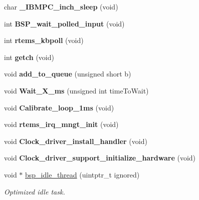 \begin{DoxyCompactItemize}
char {\bfseries \+\_\+\+I\+B\+M\+P\+C\+\_\+inch\+\_\+sleep} (void)
\item 
\mbox{\label{group__RTEMSBSPsI386_ga7a603adb911a24d3d1f83840460815a3}} 
int {\bfseries B\+S\+P\+\_\+wait\+\_\+polled\+\_\+input} (void)
\item 
\mbox{\label{group__RTEMSBSPsI386_ga06d1618e36290025c8a87c423f66f895}} 
int {\bfseries rtems\+\_\+kbpoll} (void)
\item 
\mbox{\label{group__RTEMSBSPsI386_gaf5978fab9fa6dd4ced1c3a8ab1251f7b}} 
int {\bfseries getch} (void)
\item 
\mbox{\label{group__RTEMSBSPsI386_ga1f6561356e0c50db503563bc00d2c3de}} 
void {\bfseries add\+\_\+to\+\_\+queue} (unsigned short b)
\item 
\mbox{\label{group__RTEMSBSPsI386_ga7279e1add0a06702c966055df34df803}} 
void {\bfseries Wait\+\_\+\+X\+\_\+ms} (unsigned int time\+To\+Wait)
\item 
\mbox{\label{group__RTEMSBSPsI386_ga7333093911cae08c22249ab462870ee2}} 
void {\bfseries Calibrate\+\_\+loop\+\_\+1ms} (void)
\item 
\mbox{\label{group__RTEMSBSPsI386_ga93c966a09459d552a4c5443b569e5bf3}} 
void {\bfseries rtems\+\_\+irq\+\_\+mngt\+\_\+init} (void)
\item 
\mbox{\label{group__RTEMSBSPsI386_ga1037814eae8e4f0d78249e0f87fed3cb}} 
void {\bfseries Clock\+\_\+driver\+\_\+install\+\_\+handler} (void)
\item 
\mbox{\label{group__RTEMSBSPsI386_gad90bc73e8844a9a72764b76a89681b3d}} 
void {\bfseries Clock\+\_\+driver\+\_\+support\+\_\+initialize\+\_\+hardware} (void)
\item 
void $\ast$ \mbox{\hyperlink{group__RTEMSBSPsI386_ga301be7085b80c41a9c5887247003c662}{bsp\+\_\+idle\+\_\+thread}} (uintptr\+\_\+t ignored)
\begin{DoxyCompactList}\small\item\em Optimized idle task. \end{DoxyCompactList}\item 

\end{DoxyCompactItemize}
